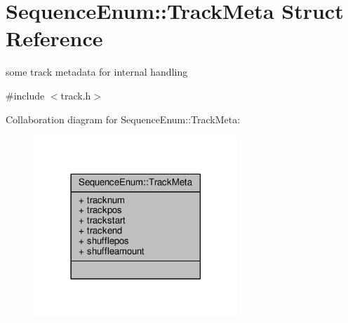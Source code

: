 \hypertarget{structSequenceEnum_1_1TrackMeta}{\section{Sequence\-Enum\-:\-:Track\-Meta Struct Reference}
\label{structSequenceEnum_1_1TrackMeta}
}


some track metadata for internal handling  




{\ttfamily \#include $<$track.\-h$>$}



Collaboration diagram for Sequence\-Enum\-:\-:Track\-Meta\-:
\nopagebreak
\begin{figure}[H]
\begin{center}
\leavevmode
\includegraphics[width=218pt]{structSequenceEnum_1_1TrackMeta__coll__graph}
\end{center}
\end{figure}
